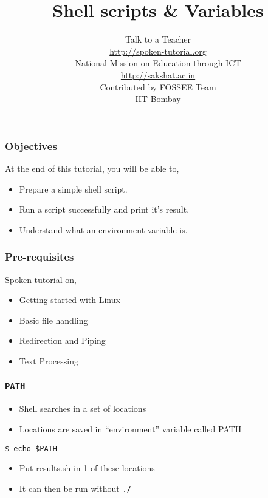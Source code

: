 \documentclass[17pt,compress]{beamer}
\author[FOSSEE]{}
\institute[IIT Bombay]{}
\date[]{}
\begin{document}
\sffamily \bfseries
\title
[Shell scripts \& Variables]
{Shell scripts \& Variables}
\author
[FOSSEE]
{\small Talk to a Teacher\\{\color{blue}\url{http://spoken-tutorial.org}}\\\vspace{0.25cm}National Mission on Education
 through ICT\\{\color{blue}\url{ http://sakshat.ac.in}} \\ [1.65cm]
   Contributed by FOSSEE Team \\IIT Bombay  \\[0.3cm]
}

\begin{frame}
   \titlepage
\end{frame}

\begin{frame}
\frametitle{Objectives}
\label{sec-2}

At the end of this tutorial, you will be able to,
\begin{itemize}
\item Prepare a simple shell script. 
\item Run a script successfully and print it's result.
\item Understand what an environment variable is.
\end{itemize}
\end{frame}

\begin{frame}
\frametitle{Pre-requisites}
\label{sec-3}

Spoken tutorial on,
\begin{itemize}
\item Getting started with Linux
\item Basic file handling
\item Redirection and Piping
\item Text Processing
\end{itemize}
\end{frame}

\begin{frame}[fragile]
  \frametitle{\texttt{PATH}}
  \begin{itemize}
  \item Shell searches in a set of locations 
  \item Locations are saved in ``environment'' variable called PATH
  \end{itemize}
  \hspace{30pt}\texttt{\$ echo \$PATH}
  \begin{itemize}
  \item Put results.sh in 1 of these locations
  \item It can then be run without \texttt{./} 
  \end{itemize}
\end{frame}
\end{document}
